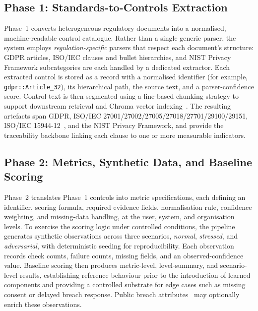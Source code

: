 \documentclass[conference]{IEEEtran}
\begin{document}
\subsection{Phase 1: Standards-to-Controls Extraction}\label{sec:phase1}
Phase~1 converts heterogeneous regulatory documents into a normalised,
machine-readable control catalogue. Rather than a single generic parser, the
system employs \emph{regulation-specific} parsers that respect each
document's structure: GDPR articles, ISO/IEC clauses and bullet hierarchies,
and NIST Privacy Framework subcategories are each handled by a dedicated
extractor. Each extracted control is stored as a record with a normalised
identifier (for example, \texttt{gdpr::Article\_32}), its hierarchical path,
the source text, and a parser-confidence score. Control text is then
segmented using a line-based chunking strategy to support downstream retrieval
and Chroma vector indexing~\cite{chroma_docs}. The resulting artefacts span GDPR,
ISO/IEC 27001/27002/27005/27018/27701/29100/29151, ISO/IEC
15944-12~\cite{iso15944_12_2020}, and the NIST Privacy Framework, and
provide the traceability backbone linking each clause to one or more
measurable indicators.

\subsection{Phase 2: Metrics, Synthetic Data, and Baseline Scoring}\label{sec:phase2}
Phase~2 translates Phase~1 controls into metric specifications, each defining
an identifier, scoring formula, required evidence fields, normalisation rule,
confidence weighting, and missing-data handling, at the user, system, and
organisation levels. To exercise the scoring logic under controlled
conditions, the pipeline generates synthetic observations across three
scenarios, \emph{normal}, \emph{stressed}, and \emph{adversarial}, with
deterministic seeding for reproducibility. Each observation records check
counts, failure counts, missing fields, and an observed-confidence value.
Baseline scoring then produces metric-level, level-summary, and
scenario-level results, establishing reference behaviour prior to the
introduction of learned components and providing a controlled substrate for
edge cases such as missing consent or delayed breach response. Public breach
attributes~\cite{enisa_tl_2024,prc_breaches} may optionally enrich these
observations.
\end{document}
